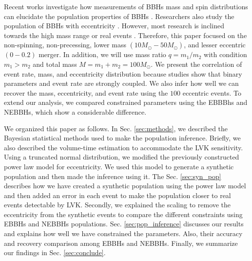 \documentclass[twocolumn,prd,nofootinbib]{revtex4}
\begin{document}
Recent works investigate how measurements of BBHs mass and spin distributions can elucidate the population properties of BBHs \cite{Dan_2019, Michael-2015, Mandel_2017_Errors, samsing-hamers-2019,  belczynski-2016, Colm-2017, Akinobu-2017, Michael-zevin-2017, farr-2017-nature, Richard-2017-natal-kicks, Dan-Richard-2018,Abbot-2019-pop}. Researchers also study the population of BBHs with eccentricity \cite{lower-2018-ecc-pop,Fang-2019}. However, most research is inclined towards the high mass range or real events \cite{wu-2020}. Therefore, this paper focused on the non-spinning, non-precessing, lower mass $(10 M_\odot - 50 M_\odot)$, and lesser eccentric $(0-0.2)$ merger. In addition, we will use mass ratio $q=m_1/m_2$ with condition $m_1>m_2$ and total mass $M=m_1+m_2=100M_\odot$.
We present the correlation of event rate, mass, and eccentricity distribution because studies show that binary parameters and event rate are strongly coupled. We also infer how well we can recover the mass, eccentricity, and event rate using the $100$ eccentric events. To extend our analysis, we compared constrained parameters using the EBBBhs and NEBBHs, which show a considerable difference.



We organized this paper as follows. In Sec. \ref{sec:methods}, we described the Bayesian statistical methods used to make the population inference. Briefly, we also described the volume-time estimation to accommodate the LVK sensitivity. Using a truncated normal distribution, we modified the previously constructed\cite{fishbach-2017,2018talbot_bbh_model} power law model for eccentricity. We used this model to generate a synthetic population and then made the inference using it. The Sec. \ref{sec:syn_pop} describes how we have created a synthetic population using the power law model and then added an error in each event to make the population closer to real events detectable by LVK. Secondly, we explained the scaling to remove the eccentricity from the synthetic events to compare the different constraints using EBBHs and NEBBHs populations. Sec. \ref{sec:pop_inference} discusses our results and explains how well we have constrained the parameters. Also, their accuracy and recovery comparison among EBBHs and NEBBHs. Finally, we summarize our findings in Sec. \ref{sec:conclude}.



\end{document}
